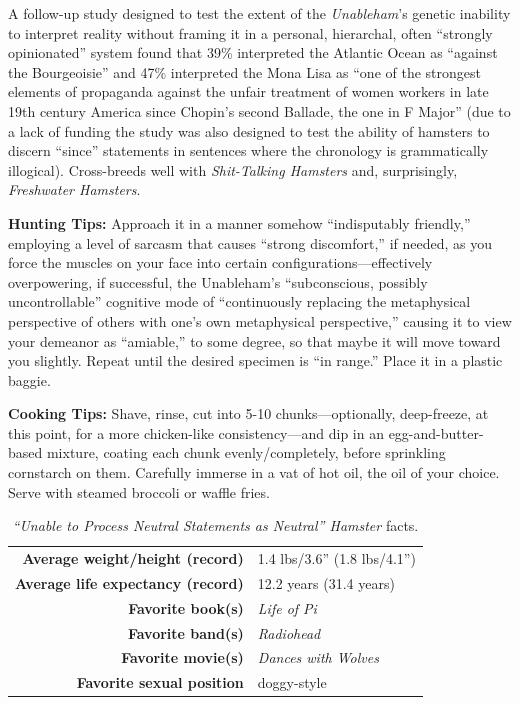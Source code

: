 \documentclass[10pt,twoside,openright]{memoir}
\begin{document}
A follow-up study designed to test the extent of the {\em
Unableham}'s genetic inability to interpret reality without framing it in a
personal, hierarchal, often ``strongly opinionated'' system found that 39\%
interpreted the Atlantic Ocean as ``against the Bourgeoisie'' and 47\%
interpreted the Mona Lisa as ``one of the strongest elements of propaganda
against the unfair treatment of women workers in late 19th century America since
Chopin's second Ballade, the one in F Major'' (due to a lack of funding the
study was also designed to test the ability of hamsters to discern ``since''
statements in sentences where the chronology is grammatically illogical).
Cross-breeds well with {\em Shit-Talking Hamsters} and, surprisingly, {\em
Freshwater Hamsters}.

\noindent
\textbf{Hunting Tips:} Approach it in a manner somehow ``indisputably friendly,''
employing a level of sarcasm that causes ``strong discomfort,'' if needed, as
you force the muscles on your face into certain configurations---effectively
overpowering, if successful, the Unableham's ``subconscious, possibly
uncontrollable'' cognitive mode of ``continuously replacing the metaphysical
perspective of others with one's own metaphysical perspective,'' causing it to
view your demeanor as ``amiable,'' to some degree, so that maybe it will move
toward you slightly. Repeat until the desired specimen is ``in range.'' Place it
in a plastic baggie.

\vspace{1em}
\noindent
\textbf{Cooking Tips:} Shave, rinse, cut into 5-10 chunks---optionally, 
deep-freeze, at this point, for a more chicken-like consistency---and dip in an
egg-and-butter-based mixture, coating each chunk evenly/completely, before
sprinkling cornstarch on them. Carefully immerse in a vat of hot oil, the oil of
your choice. Serve with steamed broccoli or waffle fries.

\begin{table}
\begin{center}
  \small
  \begin{tabular}{rl}
  \textbf{Average weight/height (record)} & 1.4 lbs/3.6'' (1.8 lbs/4.1'') \\
  \textbf{Average life expectancy (record)} & 12.2 years (31.4 years) \\
  \textbf{Favorite book(s)} & {\em Life of Pi} \\
  \textbf{Favorite band(s)} & {\em Radiohead} \\
  \textbf{Favorite movie(s)} &  {\em Dances with Wolves} \\
  \textbf{Favorite sexual position} & doggy-style \\
  \end{tabular}
\end{center}
\caption*{{\em ``Unable to Process Neutral Statements as Neutral'' Hamster} 
facts.}
\end{table}
\end{document}
